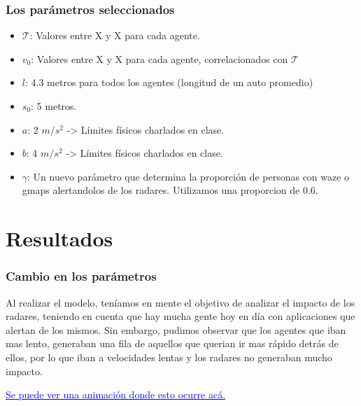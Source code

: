 \documentclass[10pt, compress]{beamer}
\begin{document}
\begin{frame}[fragile]

\frametitle{Los par\'ametros seleccionados}

\begin{itemize}

\item $\mathcal{T}$: Valores entre X y X para cada agente.
\item $v_0$: Valores entre X y X para cada agente, correlacionados con  $\mathcal{T}$
\item $l$: 4.3 metros para todos los agentes (longitud de un auto promedio)
\item $s_0$: 5 metros.
\item $a$: 2 $m/s^2$ -> Límites físicos charlados en clase.
\item $b$: 4 $m/s^2$ -> Límites físicos charlados en clase.
\item $\gamma$: Un nuevo par\'ametro que determina la proporci\'on de personas con waze o gmaps alertandolos de los radares. Utilizamos una proporcion de 0.6.

\end{itemize}

\end{frame}

\section{Resultados}

\begin{frame}
\frametitle{Cambio en los par\'ametros}

Al realizar el modelo, ten\'iamos en mente el objetivo de analizar el impacto de los radares, teniendo en cuenta que hay mucha gente hoy en d\'ia con aplicaciones que alertan de los mismos. Sin embargo, pudimos observar que los agentes que iban mas lento, generaban una fila de aquellos que querian ir mas r\'apido detr\'as de ellos, por lo que iban a velocidades lentas y los radares no generaban mucho impacto.

\href{https://www.youtube.com/watch?v=-Pg819il8lY}{\textcolor{blue}{Se puede ver una animaci\'on donde esto ocurre ac\'a.}}


\end{frame}
\end{document}
